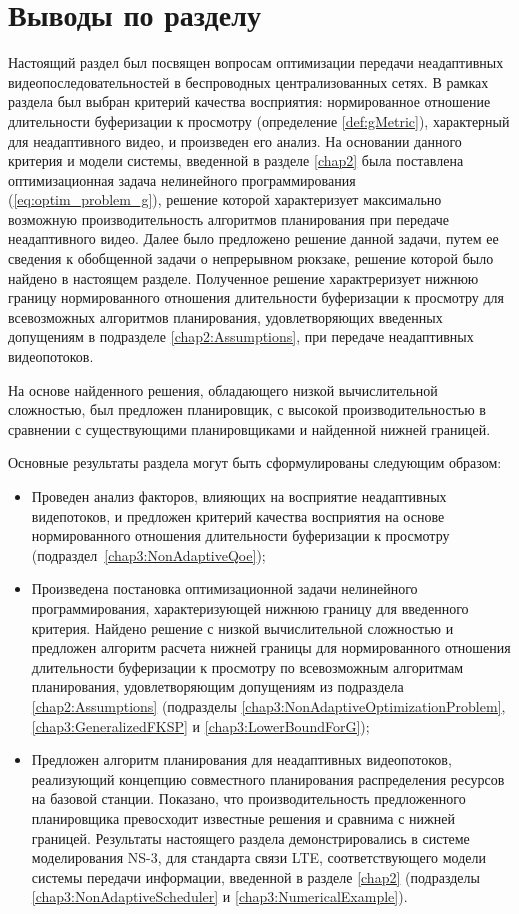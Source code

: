 \section{Выводы по разделу}

Настоящий раздел был посвящен вопросам оптимизации передачи неадаптивных видеопоследовательностей в беспроводных централизованных сетях. В рамках раздела был выбран критерий качества восприятия: нормированное отношение длительности буферизации к просмотру (определение \ref{def:gMetric}), характерный для неадаптивного видео, и произведен его анализ. На основании данного критерия и модели системы, введенной в разделе \ref{chap2} была поставлена оптимизационная задача нелинейного программирования (\ref{eq:optim_problem_g}), решение которой характеризует максимально возможную производительность алгоритмов планирования при передаче неадаптивного видео. Далее было предложено решение данной задачи, путем ее сведения к обобщенной задачи о непрерывном рюкзаке, решение которой было найдено в настоящем разделе. Полученное решение характреризует нижнюю границу нормированного отношения длительности буферизации к просмотру для всевозможных алгоритмов планирования, удовлетворяющих введенных допущениям в подразделе \ref{chap2:Assumptions}, при передаче неадаптивных видеопотоков.

На основе найденного решения, обладающего низкой вычислительной сложностью, был предложен планировщик, с высокой производительностью в сравнении с существующими планировщиками и найденной нижней границей.

Основные результаты раздела могут быть сформулированы следующим образом:
\begin{itemize}
	\item Проведен анализ факторов, влияющих на восприятие неадаптивных видепотоков, и предложен критерий качества восприятия на основе нормированного отношения длительности буферизации к просмотру (подраздел~\ref{chap3:NonAdaptiveQoe});
	\item Произведена постановка оптимизационной задачи нелинейного программирования, характеризующей нижнюю границу для введенного критерия. Найдено решение с низкой вычислительной сложностью и предложен алгоритм расчета нижней границы для нормированного отношения длительности буферизации к просмотру по всевозможным алгоритмам планирования, удовлетворяющим допущениям из подраздела \ref{chap2:Assumptions} (подразделы \ref{chap3:NonAdaptiveOptimizationProblem}, \ref{chap3:GeneralizedFKSP} и \ref{chap3:LowerBoundForG});
	\item Предложен алгоритм планирования для неадаптивных видеопотоков, реализующий концепцию совместного планирования распределения ресурсов на базовой станции. Показано, что производительность предложенного планировщика превосходит известные решения и сравнима с нижней границей. Результаты настоящего раздела демонстрировались в системе моделирования NS-3, для стандарта связи LTE, соответствующего модели системы передачи информации, введенной в разделе \ref{chap2} (подразделы \ref{chap3:NonAdaptiveScheduler} и \ref{chap3:NumericalExample}).
\end{itemize}
